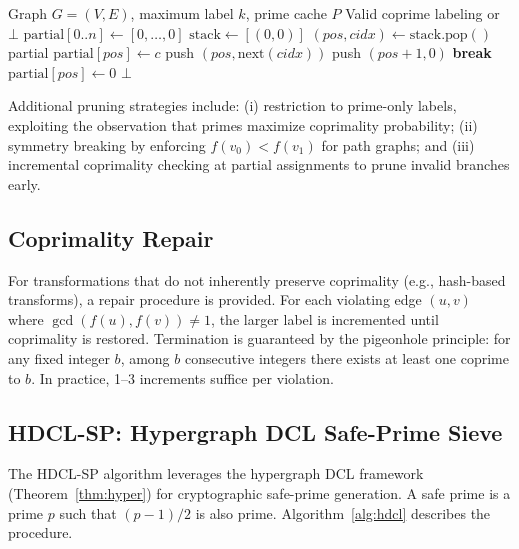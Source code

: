 \documentclass[lettersize,journal]{IEEEtran}
\begin{document}
\begin{algorithm}[!t]
\caption{Zero-Clone Backtracking BFS}\label{alg:bfs}
\begin{algorithmic}
\REQUIRE Graph $G = (V, E)$, maximum label $k$, prime cache $P$
\ENSURE Valid coprime labeling or $\bot$
\STATE $\text{partial}[0..n] \leftarrow [0, \ldots, 0]$
\STATE $\text{stack} \leftarrow [(0, 0)]$
    \STATE $(pos, cidx) \leftarrow \text{stack.pop}()$
        \RETURN partial 
    \ENDIF
            \STATE $\text{partial}[pos] \leftarrow c$
            \STATE push $(pos, \text{next}(cidx))$ 
            \STATE push $(pos+1, 0)$ 
            \STATE \textbf{break}
        \ENDIF
    \ENDFOR
    \STATE $\text{partial}[pos] \leftarrow 0$ 
\ENDWHILE
\RETURN $\bot$
\end{algorithmic}
\end{algorithm}

Additional pruning strategies include: (i) restriction to prime-only labels, exploiting the observation that primes maximize coprimality probability; (ii) symmetry breaking by enforcing $f(v_0) < f(v_1)$ for path graphs; and (iii) incremental coprimality checking at partial assignments to prune invalid branches early.

\subsection{Coprimality Repair}

For transformations that do not inherently preserve coprimality (e.g., hash-based transforms), a repair procedure is provided. For each violating edge $(u,v)$ where $\gcd(f(u), f(v)) \neq 1$, the larger label is incremented until coprimality is restored. Termination is guaranteed by the pigeonhole principle: for any fixed integer $b$, among $b$ consecutive integers there exists at least one coprime to $b$. In practice, 1--3 increments suffice per violation.

\subsection{HDCL-SP: Hypergraph DCL Safe-Prime Sieve}

The HDCL-SP algorithm leverages the hypergraph DCL framework (Theorem~\ref{thm:hyper}) for cryptographic safe-prime generation. A safe prime is a prime $p$ such that $(p-1)/2$ is also prime. Algorithm~\ref{alg:hdcl} describes the procedure.
\end{document}
